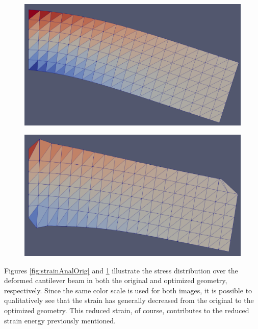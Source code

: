 \begin{figure}[ht]
\centering
\begin{minipage}{.5\textwidth}
  \centering
  \includegraphics[width=0.9\linewidth]{images/strainAnalysis_original.png}
  \label{fig:strainAnalOrig}
\end{minipage}%
\begin{minipage}{.5\textwidth}
  \centering
  \includegraphics[width=0.9\linewidth]{images/strainAnalysis_optimized.png}
  \label{fig:strainAnalOpt}
\end{minipage}
\end{figure}
Figures \ref{fig:strainAnalOrig} and \ref{fig:strainAnalOpt} illustrate the stress distribution over the deformed cantilever beam in both the original and optimized geometry, respectively. Since the same color scale is used for both images, it is possible to qualitatively see that the strain has generally decreased from the original to the optimized geometry. This reduced strain, of course, contributes to the reduced strain energy previously mentioned.\\[6pt]
